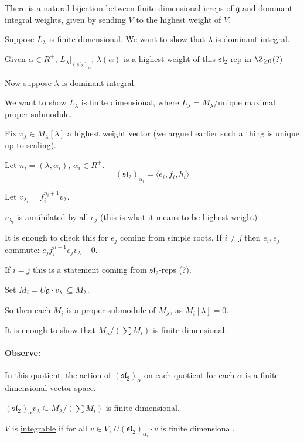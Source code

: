 \documentclass[x11names,reqno,14pt]{extarticle}
\newcommand{\mk}[1]{\mathfrak{#1}}
\newcommand{\g}{\mk{g}}
\renewcommand{\sl}{\mk{s}\mk{l}}
\begin{document}
\cor

There is a natural bijection between finite dimensional irreps of $\g$ and dominant integral weights, given by sending $V$ to the highest weight of $V$. 

\proof

Suppose $L_\lambda$ is finite dimensional. We want to show that $\lambda$ is dominant integral. 

Given $\alpha\in R^+$, $L_{\lambda}|_{(\sl_2)_\alpha}$, $\lambda(\alpha)$ is a highest weight of this $\sl_2$-rep in $\Z_{\geq0}$(?)

Now suppose $\lambda$ is dominant integral. 

We want to show $L_\lambda$ is finite dimensional, where $L_\lambda = M_\lambda / $unique maximal proper submodule.

Fix $v_\lambda \in M_\lambda[\lambda]$ a highest weight vector (we argued earlier such a thing is unique up to scaling). 

Let $n_i = (\lambda,\alpha_i)$, $\alpha_i\in R^+$. 
\[
(\sl_2)_{\alpha_i} = \langle e_i, f_i, h_i \rangle
\]

Let $v_{\lambda_i} = f_i^{n_i+1}v_\lambda$. 

\claim

$v_{\lambda_i}$ is annihilated by all $e_j$ (this is what it means to be highest weight)

\proof

It is enough to check this for $e_j$ coming from simple roots. If $i\neq j$ then $e_i,e_j$ commute: $e_jf_i^{n+1}e_jv_\lambda-0$. 

If $i = j$ this is a statement coming from $\sl_2$-reps (?). 

Set $M_i = U\g\cdot v_{\lambda_i}\subseteq M_\lambda$. 

So then each $M_i$ is a proper submodule of $M_\lambda$, as $M_i[\lambda]=0$. 

It is enough to show that $M_\lambda/(\sum M_i)$ is finite dimensional. 

\paragraph{Observe:} In this quotient, the action of $(\sl_2)_\alpha$ on each quotient for each $\alpha$ is a finite dimensional vector space. 

$(\sl_2)_\alpha v_\lambda \subseteq M_\lambda/(\sum M_i)$ is finite dimensional. 


$V$ is \underline{integrable} if for all $v \in V$, $U(\sl_2)_{\alpha_i}\cdot v$ is finite dimensional.
\end{document}
